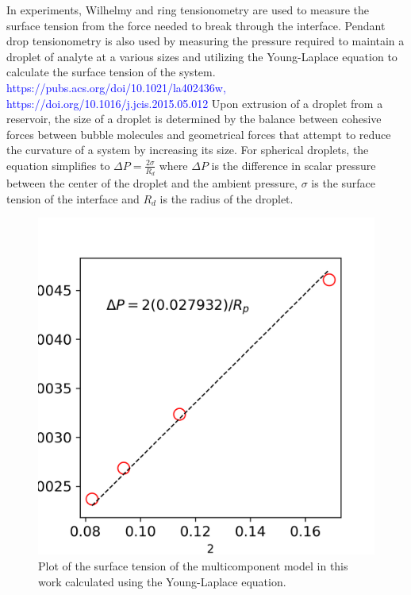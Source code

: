 In experiments, Wilhelmy and ring tensionometry are used to measure the surface tension from the force needed to break through the interface. Pendant drop tensionometry is also used by measuring the pressure required to maintain a droplet of analyte at a various sizes and utilizing the Young-Laplace equation to calculate the surface tension of the system. \textcolor{blue}{https://pubs.acs.org/doi/10.1021/la402436w, https://doi.org/10.1016/j.jcis.2015.05.012} Upon extrusion of a droplet from a reservoir, the size of a droplet is determined by the balance between cohesive forces between bubble molecules and geometrical forces that attempt to reduce the curvature of a system by increasing its size. For spherical droplets, the equation simplifies to $\Delta P = \frac{2 \sigma}{R_d}$ where $\Delta P$ is the difference in scalar pressure between the center of the droplet and the ambient pressure, $\sigma$ is the surface tension of the interface and $R_d$ is the radius of the droplet. 

\begin{figure}[h]
    \centering
    \includegraphics[scale = 0.5]{figures/model_validation/surface_tension.png}
    \caption{Plot of the surface tension of the multicomponent model in this work calculated using the Young-Laplace equation.}
    \label{fig:young_laplace_valid}
\end{figure}


